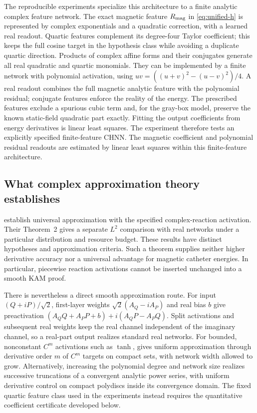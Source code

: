 \documentclass[doublespace,Afour,sageh,times]{sagej}
\theoremstyle{definition}
\begin{document}
The reproducible experiments specialize this architecture to a finite analytic complex feature network. The exact magnetic feature $R_{\rm mag}$ in \eqref{eq:unified-h} is represented by complex exponentials and a quadratic correction, with a learned real readout. Quartic features complement its degree-four Taylor coefficient; this keeps the full cosine target in the hypothesis class while avoiding a duplicate quartic direction. Products of complex affine forms and their conjugates generate all real quadratic and quartic monomials. They can be implemented by a finite network with polynomial activation, using $uv=((u+v)^2-(u-v)^2)/4$. A real readout combines the full magnetic analytic feature with the polynomial residual; conjugate features enforce the reality of the energy. The prescribed features exclude a spurious cubic term and, for the gray-box model, preserve the known static-field quadratic part exactly. Fitting the output coefficients from energy derivatives is linear least squares. The experiment therefore tests an explicitly specified finite-feature CHNN. The magnetic coefficient and polynomial residual readouts are estimated by linear least squares within this finite-feature architecture.

\subsection{What complex approximation theory establishes}
\citet[Theorem~1]{zhang} establish universal approximation with the specified complex-reaction activation. Their Theorem~2 gives a separate $L^2$ comparison with real networks under a particular distribution and resource budget. These results have distinct hypotheses and approximation criteria. Such a theorem supplies neither higher derivative accuracy nor a universal advantage for magnetic catheter energies. In particular, piecewise reaction activations cannot be inserted unchanged into a smooth KAM proof.

There is nevertheless a direct smooth approximation route. For input
$(Q+iP)/\sqrt2$, first-layer weights $\sqrt2(A_Q-iA_P)$ and real bias $b$
give preactivation $(A_QQ+A_PP+b)+i(A_QP-A_PQ)$.
Split activations and subsequent real weights keep the real channel
independent of the imaginary channel, so a real-part output realizes
standard real networks. For bounded, nonconstant $C^m$ activations such as
$\tanh$, \citet[Theorem~3]{hornik} gives uniform approximation through
derivative order $m$ of $C^m$ targets on compact sets, with network width
allowed to grow. Alternatively, increasing the polynomial degree and
network size realizes successive truncations of a convergent analytic
power series, with uniform derivative control on compact polydiscs inside
its convergence domain. The fixed quartic feature class used in the
experiments instead requires the quantitative coefficient certificate
developed below.
\end{document}
